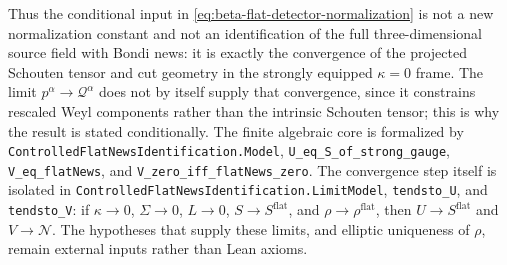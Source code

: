 \documentclass[11pt,a4paper]{article}
\begin{document}
Thus the conditional input in \eqref{eq:beta-flat-detector-normalization} is not a new normalization constant and not an identification of the full three-dimensional source field with Bondi news: it is exactly the convergence of the projected Schouten tensor and cut geometry in the strongly equipped \(\kappa=0\) frame.  The limit \(p^\alpha\to\mathcal Q^\alpha\) does not by itself supply that convergence, since it constrains rescaled Weyl components rather than the intrinsic Schouten tensor; this is why the result is stated conditionally.  The finite algebraic core is formalized by \texttt{ControlledFlatNewsIdentification.Model}, \texttt{U\_eq\_S\_of\_strong\_gauge}, \texttt{V\_eq\_flatNews}, and \texttt{V\_zero\_iff\_flatNews\_zero}.  The convergence step itself is isolated in \texttt{ControlledFlatNewsIdentification.LimitModel}, \texttt{tendsto\_U}, and \texttt{tendsto\_V}: if \(\kappa\to0\), \(\Sigma\to0\), \(L\to0\), \(S\to S^{\mathrm{flat}}\), and \(\rho\to\rho^{\mathrm{flat}}\), then \(U\to S^{\mathrm{flat}}\) and \(V\to\mathcal N\).  The hypotheses that supply these limits, and elliptic uniqueness of \(\rho\), remain external inputs rather than Lean axioms.
\end{document}

